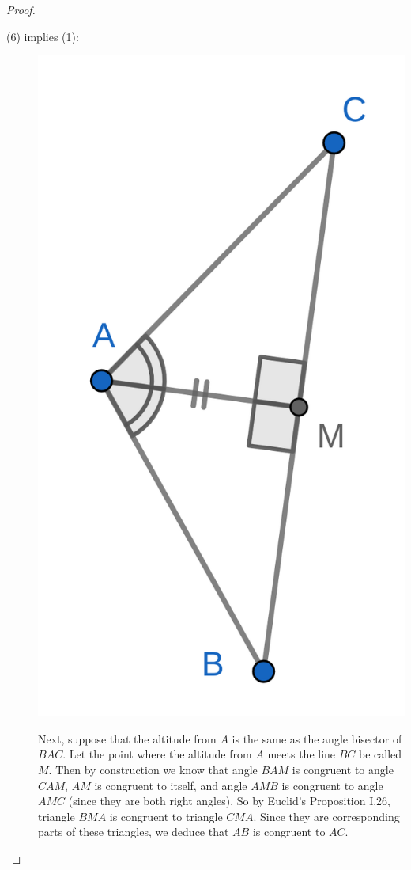 \documentclass{tufte-handout}
\theoremstyle{definition}
\begin{document}
\begin{proof}
\begin{description}
\item[(6) implies (1):]
\begin{marginfigure}
  \includegraphics{images/iso_3.png}
\end{marginfigure}
Next, suppose that the altitude from $A$ is the same as the angle bisector of $BAC$. Let the point where the altitude from $A$ meets the line $BC$ be called $M$. Then by construction we know that angle $BAM$ is congruent to angle $CAM$, $AM$ is congruent to itself, and angle $AMB$ is congruent to angle $AMC$ (since they are both right angles). So by Euclid's Proposition I.26, triangle $BMA$ is congruent to triangle $CMA$. Since they are corresponding parts of these triangles, we deduce that $AB$ is congruent to $AC$.


\end{description}
\end{proof}
\end{document}
